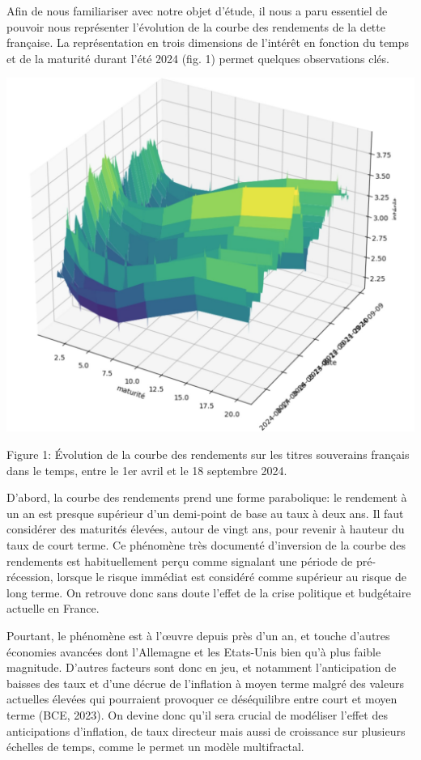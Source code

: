 \documentclass[a4paper]{article}
\begin{document}
Afin de nous familiariser avec notre objet d’étude, il nous a paru essentiel de pouvoir nous représenter l’évolution de la courbe des rendements de la dette française. La représentation en trois dimensions de l’intérêt en fonction du temps et de la maturité durant l’été 2024 (fig. 1) permet quelques observations clés.
\begin{center}

\includegraphics[scale=0.28]{intd.jpg}

Figure 1: Évolution de la courbe des rendements sur les titres souverains français dans le temps, entre le 1er avril et le 18 septembre 2024.
\end{center}



D’abord, la courbe des rendements prend une forme parabolique: le rendement à un an est presque supérieur d’un demi-point de base au taux à deux ans. Il faut considérer des maturités élevées, autour de vingt ans, pour revenir à hauteur du taux de court terme. Ce phénomène très documenté d’inversion de la courbe des rendements est habituellement perçu comme signalant une période de pré-récession, lorsque le risque immédiat est considéré comme supérieur au risque de long terme. On retrouve donc sans doute l’effet de la crise politique et budgétaire actuelle en France. 

Pourtant, le phénomène est à l’œuvre depuis près d’un an, et touche d’autres économies avancées dont l’Allemagne et les Etats-Unis bien qu’à plus faible magnitude. D’autres facteurs sont donc en jeu, et notamment l’anticipation de baisses des taux et d’une décrue de l’inflation à moyen terme malgré des valeurs actuelles élevées qui pourraient provoquer ce déséquilibre entre court et moyen terme (BCE, 2023). On devine donc qu’il sera crucial de modéliser l’effet des anticipations d’inflation, de taux directeur mais aussi de croissance sur plusieurs échelles de temps, comme le permet un modèle multifractal.
\end{document}
